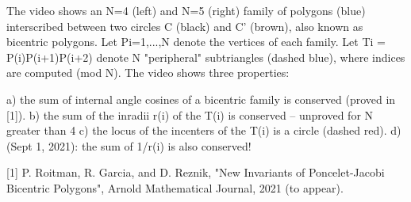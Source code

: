The video shows an N=4 (left) and N=5 (right) family of polygons (blue) interscribed between two circles C (black) and C' (brown), also known as bicentric polygons. Let Pi=1,...,N denote the vertices of each family. Let Ti = P(i)P(i+1)P(i+2) denote N "peripheral" subtriangles (dashed blue), where indices are computed (mod N). The video shows three properties:

a) the sum of internal angle cosines of a bicentric family is conserved (proved in [1]).
b) the sum of the inradii r(i) of the T(i) is conserved -- unproved for N greater than 4
c) the locus of the incenters of the T(i) is a circle (dashed red).
d) (Sept 1, 2021): the sum of 1/r(i) is also conserved!

[1] P. Roitman, R. Garcia, and D. Reznik, "New Invariants of Poncelet-Jacobi Bicentric Polygons",  Arnold Mathematical Journal, 2021 (to appear).